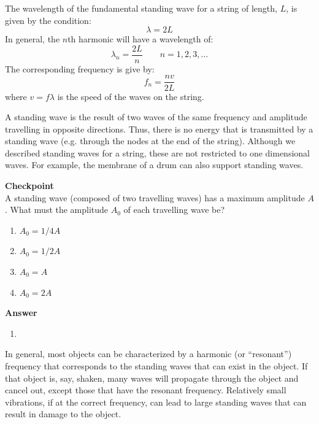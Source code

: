 The wavelength of the fundamental standing wave for a string of length, $L$, is given by the condition:
\begin{equation}
\lambda = 2L
\end{equation}
In general, the $n$th harmonic will have a wavelength of:
\begin{equation}
\boxed{\lambda_n = \frac{2L}{n}\quad\quad n=1,2,3,\dots}
\end{equation}
The corresponding frequency is give by:
\begin{equation}
\boxed{f_n =\frac{nv}{2L}}
\end{equation}
where $v=f\lambda$ is the speed of the waves on the string.

A standing wave is the result of two waves of the same frequency and amplitude travelling in opposite directions. Thus, there is no energy that is transmitted by a standing wave (e.g. through the nodes at the end of the string). Although we described standing waves for a string, these are not restricted to one dimensional waves. For example, the membrane of a drum can also support standing waves.

\begin{framed}
\textbf{Checkpoint}\\
A standing wave (composed of two travelling waves) has a maximum amplitude $A$. What must the amplitude $A_0$ of each travelling wave be?

\begin{enumerate}
\item $A_0=1/4 A$
\item $A_0=1/2 A$
\item $A_0=A$
\item $A_0=2A$
\end{enumerate}

\begin{framed}
\textbf{Answer}\\
\begin{enumerate}[resume]
\item
\end{enumerate}
\end{framed}
\end{framed}

In general, most objects can be characterized by a harmonic (or ``resonant'') frequency that corresponds to the standing waves that can exist in the object. If that object is, say, shaken, many waves will propagate through the object and cancel out, except those that have the resonant frequency. Relatively small vibrations, if at the correct frequency, can lead to large standing waves that can result in damage to the object.

